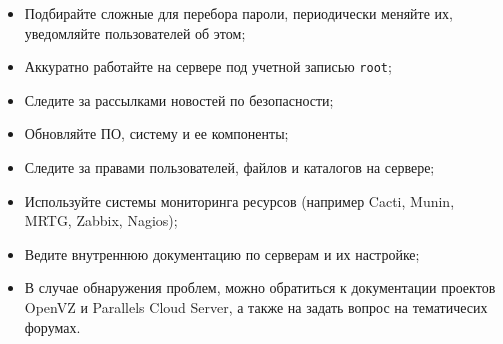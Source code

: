 \begin{itemize}
    \item Подбирайте сложные для перебора пароли, периодически меняйте их, уведомляйте пользователей об этом;
    \item Аккуратно работайте на сервере под учетной записью \texttt{root};
    \item Следите за рассылками новостей по безопасности;
    \item Обновляйте ПО, систему и ее компоненты;
    \item Следите за правами пользователей, файлов и каталогов на сервере;
    \item Используйте системы мониторинга ресурсов (например Cacti, Munin, MRTG, Zabbix, Nagios);
    \item Ведите внутреннюю документацию по серверам и их настройке;
    \item В случае обнаружения проблем, можно обратиться к документации проектов OpenVZ и Parallels Cloud Server, а также на задать вопрос на тематичесих форумах.
\end{itemize}

\clearpage
